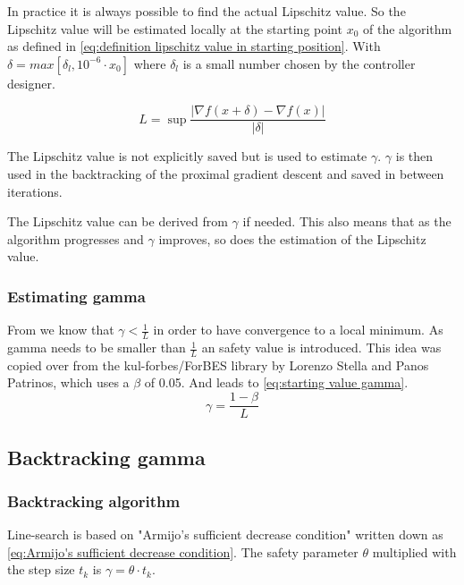 			In practice it is always possible to find the actual Lipschitz value. So the Lipschitz value will be estimated locally at the starting point $x_0$ of the algorithm as defined in \eqref{eq:definition lipschitz value in starting position}. With $\delta=max[\delta_l,10^{-6} \cdot x_0]$ where $\delta_l$ is a small number chosen by the controller designer.
			
			\begin{equation}
			L = \underset{}{\sup} \frac{|\nabla f(x+\delta)-\nabla f(x)|}{|\delta|}
			\label{eq:definition lipschitz value in starting position}
			\end{equation}
			
			The Lipschitz value is not explicitly saved but is used to estimate $\gamma$. $\gamma$ is then used in the backtracking of the proximal gradient descent and saved in between iterations. 
			
			The Lipschitz value can be derived from $\gamma$ if needed. This also means that as the algorithm progresses and $\gamma$ improves, so does the estimation of the Lipschitz value. 
		
		\subsubsection{Estimating gamma}	
			From \cite{LorenzoStella2017} we know that $\gamma<\frac{1}{L}$ in order to have convergence to a local minimum. As gamma needs to be smaller than $\frac{1}{L}$ an safety value is introduced. This idea was copied over from the kul-forbes/ForBES library by Lorenzo Stella and Panos Patrinos, which uses a $\beta$ of 0.05. And leads to \eqref{eq:starting value gamma}.
			\begin{equation}
			\gamma = \frac{1-\beta}{L}
			\label{eq:starting value gamma}
			\end{equation}		
	
	\subsection{Backtracking gamma}
		\subsubsection{Backtracking algorithm}
			Line-search is based on "Armijo's sufficient decrease condition" written down as \eqref{eq:Armijo's sufficient decrease condition}. The safety parameter $\theta$ multiplied with the step size $t_k$ is $\gamma=\theta \cdot t_k$. 
			
